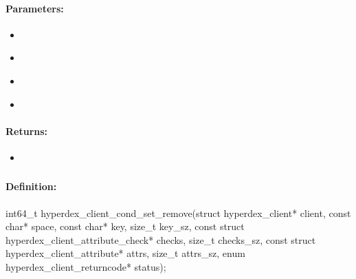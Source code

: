 \paragraph{Parameters:}
\begin{itemize}[noitemsep]
\item {}\\

\item {}\\

\item {}\\

\item {}\\

\end{itemize}

\paragraph{Returns:}
\begin{itemize}[noitemsep]
\item {}\\

\end{itemize}

\pagebreak
\subsubsection{}
\label{api:c:cond_set_remove}


\paragraph{Definition:}
\begin{ccode}
int64_t hyperdex_client_cond_set_remove(struct hyperdex_client* client,
        const char* space,
        const char* key, size_t key_sz,
        const struct hyperdex_client_attribute_check* checks, size_t checks_sz,
        const struct hyperdex_client_attribute* attrs, size_t attrs_sz,
        enum hyperdex_client_returncode* status);
\end{ccode}

